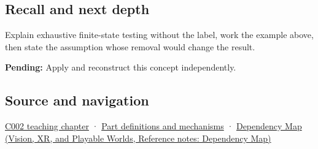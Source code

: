 \subsection{Recall and next depth}\label{appendix-05db24ccc28a-recall-and-next-depth}

Explain exhaustive finite-state testing without the label, work the example above, then state the assumption whose removal would change the result.

\textbf{Pending:} Apply and reconstruct this concept independently.

\subsection{Source and navigation}\label{appendix-05db24ccc28a-source-and-navigation}

\hyperref[01-foundations-i-ch001-arithmetic-becomes-a-policy]{C002 teaching chapter} · \hyperref[appendix-fd090d982a15]{Part definitions and mechanisms} · \href{../07-Vision-XR-and-Playable-Worlds/main.pdf\#nameddest=appendix-4ad47bdd269a}{Dependency Map (Vision, XR, and Playable Worlds, Reference notes: Dependency Map)}
